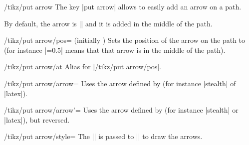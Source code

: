 \documentclass[a4paper]{ltxdoc}
\begin{document}
\begin{key}{/tikz/put arrow}
The key |put arrow| allows to easily add an arrow on a path.

\begin{codeexample}[width=6cm]
\end{codeexample}

By default, the arrow is |\arrow{>}| and it is added in the middle of the path.

\begin{key}{/tikz/put arrow/pos= (initially )}
  Sets the position of the arrow on the path to   (for instance |=0.5| means that that arrow is in the middle of the path).
\end{key}

\begin{key}{/tikz/put arrow/at}
  Alias for |/tikz/put arrow/pos|.
\end{key}

\begin{key}{/tikz/put arrow/arrow=}
  Uses the arrow defined by  (for instance |stealth| of |latex|).
\end{key}

\begin{key}{/tikz/put arrow/arrow'=}
  Uses the arrow defined by  (for instance |stealth| or |latex|), but reversed.
\end{key}

\begin{codeexample}[width=6cm]
\end{codeexample}

\begin{key}{/tikz/put arrow/style=}
  The || is passed to || to draw the arrows.
\end{key}

\begin{codeexample}[width=5cm]
\end{codeexample}


\end{key}
\end{document}

